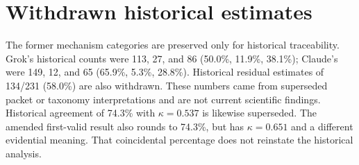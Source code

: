 \documentclass[11pt,letterpaper]{article}
\begin{document}



\section{Withdrawn historical estimates}\label{app:withdrawn}
The former mechanism categories are preserved only for historical traceability. Grok's historical counts were 113, 27, and 86 (50.0\%, 11.9\%, 38.1\%); Claude's were 149, 12, and 65 (65.9\%, 5.3\%, 28.8\%). Historical residual estimates of 134/231 (58.0\%) are also withdrawn. These numbers came from superseded packet or taxonomy interpretations and are not current scientific findings. Historical agreement of 74.3\% with $\kappa=0.537$ is likewise superseded. The amended first-valid result also rounds to 74.3\%, but has $\kappa=0.651$ and a different evidential meaning. That coincidental percentage does not reinstate the historical analysis.
\end{document}
